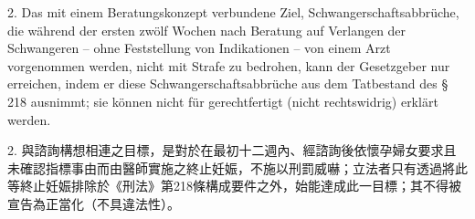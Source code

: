\documentclass[12pt]{article}
\begin{document}
\begin{sourcepara}[title={原文D.89}]
2. Das mit einem Beratungskonzept verbundene Ziel, Schwangerschaftsabbrüche, die während der ersten zwölf Wochen nach Beratung auf Verlangen der Schwangeren -- ohne Feststellung von Indikationen -- von einem Arzt vorgenommen werden, nicht mit Strafe zu bedrohen, kann der Gesetzgeber nur erreichen, indem er diese Schwangerschaftsabbrüche aus dem Tatbestand des § 218 \abbrStGB{} ausnimmt; sie können nicht für gerechtfertigt (nicht rechtswidrig) erklärt werden.
\end{sourcepara}
\begin{transpara}
2. 與諮詢構想相連之目標，是對於在最初十二週內、經諮詢後依懷孕婦女要求且未確認指標事由而由醫師實施之終止妊娠，不施以刑罰威嚇；立法者只有透過將此等終止妊娠排除於《刑法》第218條構成要件之外，始能達成此一目標；其不得被宣告為正當化（不具違法性）。
\end{transpara}
\end{document}
